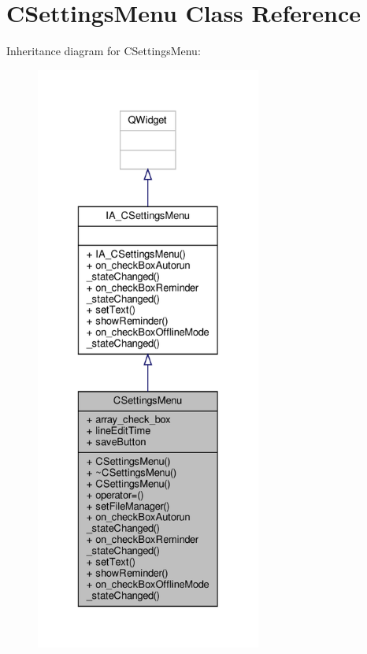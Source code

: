 \hypertarget{classCSettingsMenu}{}\section{C\+Settings\+Menu Class Reference}
\label{classCSettingsMenu}


Inheritance diagram for C\+Settings\+Menu\+:
\nopagebreak
\begin{figure}[H]
\begin{center}
\leavevmode
\includegraphics[height=550pt]{classCSettingsMenu__inherit__graph}
\end{center}
\end{figure}


